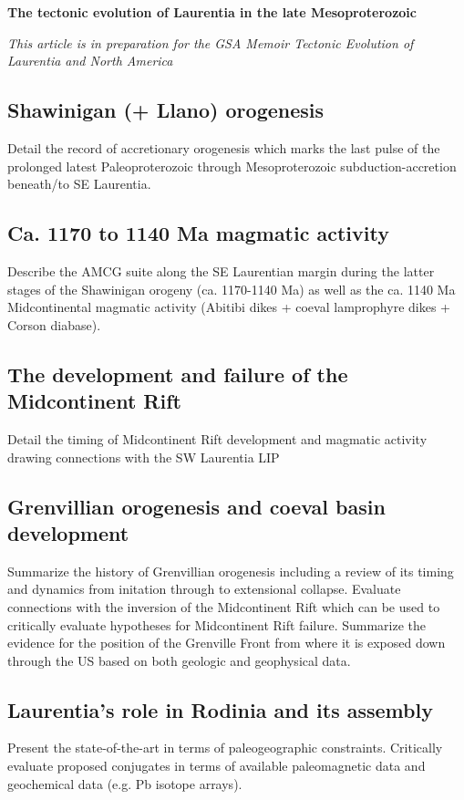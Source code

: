 \documentclass[11pt,letterpaper]{article}
\begin{document}
\begin{flushleft}
{\LARGE \textbf{The tectonic evolution of Laurentia in the late Mesoproterozoic}}

\noindent\textit{This article is in preparation for the GSA Memoir Tectonic Evolution of Laurentia and North America}
\end{flushleft}



\subsection*{Shawinigan (+ Llano) orogenesis}
Detail the record of accretionary orogenesis which marks the last pulse of the prolonged latest Paleoproterozoic through Mesoproterozoic subduction-accretion beneath/to SE Laurentia.

\subsection*{Ca. 1170 to 1140 Ma magmatic activity}
Describe the AMCG suite along the SE Laurentian margin during the latter stages of the Shawinigan orogeny (ca. 1170-1140 Ma) as well as the ca. 1140 Ma Midcontinental magmatic activity (Abitibi dikes + coeval lamprophyre dikes + Corson diabase).

\subsection*{The development and failure of the Midcontinent Rift}
Detail the timing of Midcontinent Rift development and magmatic activity drawing connections with the SW Laurentia LIP

\subsection*{Grenvillian orogenesis and coeval basin development}
Summarize the history of Grenvillian orogenesis including a review of its timing and dynamics from initation through to extensional collapse. Evaluate connections with the inversion of the Midcontinent Rift which can be used to critically evaluate hypotheses for Midcontinent Rift failure. Summarize the evidence for the position of the Grenville Front from where it is exposed down through the US based on both geologic and geophysical data.

\subsection*{Laurentia's role in Rodinia and its assembly}
Present the state-of-the-art in terms of paleogeographic constraints. Critically evaluate proposed conjugates in terms of available paleomagnetic data and geochemical data (e.g. Pb isotope arrays). 
\end{document}
